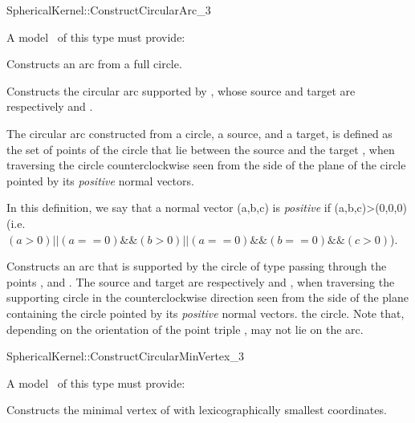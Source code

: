 \begin{ccRefFunctionObjectConcept}{SphericalKernel::ConstructCircularArc_3}

A model \ccVar\ of this type must provide:

{Constructs an arc from a full circle.}

{Constructs the circular arc supported by , whose source and target 
are respectively  and .
}

The circular arc constructed from a circle, a source, and a target, is
defined as the set of points of the circle that lie between the source 
and the target , when traversing the circle counterclockwise
seen from the side of the plane of the circle pointed by its \textit{positive} normal 
vectors.

In this definition, we say that a normal vector (a,b,c) is \textit{positive} if 
(a,b,c)>(0,0,0) (i.e. $(a>0) || (a==0) \&\& (b>0) || (a==0)\&\&(b==0)\&\&(c>0)$).


{Constructs an arc that is supported by the circle of type
   passing through the points ,
   and . The source and target are respectively 
  and , when traversing the supporting circle in the
  counterclockwise direction   
  seen from the side of the plane containing the circle pointed by its \textit{positive}
  normal vectors.
  the circle. 
  Note that, depending on the orientation of the point triple
  ,  may not lie on the arc. 
}

\end{ccRefFunctionObjectConcept}
\begin{ccRefFunctionObjectConcept}{SphericalKernel::ConstructCircularMinVertex_3} 


A model \ccVar\ of this type must provide:


{Constructs the minimal vertex of  with lexicographically 
smallest coordinates.}

\end{ccRefFunctionObjectConcept}
